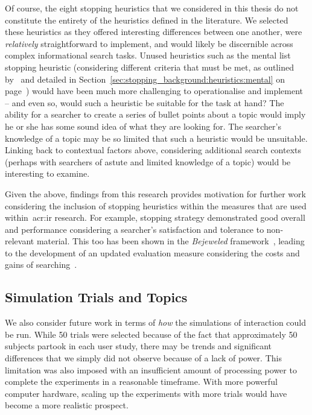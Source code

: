 Of course, the eight stopping heuristics that we considered in this thesis do not constitute the entirety of the heuristics defined in the literature. We selected these heuristics as they offered interesting differences between one another, were \emph{relatively} straightforward to implement, and would likely be discernible across complex informational search tasks. Unused heuristics such as the mental list stopping heuristic (considering different criteria that must be met, as outlined by~\cite{nickles1995judgment} and detailed in Section~\ref{sec:stopping_background:heuristics:mental} on page~\pageref{sec:stopping_background:heuristics:mental}) would have been much more challenging to operationalise and implement -- and even so, would such a heuristic be suitable for the task at hand? The ability for a searcher to create a series of bullet points about a topic would imply he or she has some sound idea of what they are looking for. The searcher's knowledge of a topic may be so limited that such a heuristic would be unsuitable. Linking back to contextual factors above, considering additional search contexts (perhaps with searchers of astute and limited knowledge of a topic) would be interesting to examine.

Given the above, findings from this research provides motivation for further work considering the inclusion of stopping heuristics within the measures that are used within~\gls{acr:ir} research. For example, stopping strategy  demonstrated good overall and performance considering a searcher's satisfaction and tolerance to non-relevant material. This too has been shown in the \emph{Bejeweled} framework~\citep{zhang2017bejewled}, leading to the development of an updated evaluation measure considering the costs and gains of searching~\citep{azzopardi2018cwl}.

\subsection{Simulation Trials and Topics}
We also consider future work in terms of \emph{how} the simulations of interaction could be run. While 50 trials were selected because of the fact that approximately 50 subjects partook in each user study, there may be trends and significant differences that we simply did not observe because of a lack of power. This limitation was also imposed with an insufficient amount of processing power to complete the experiments in a reasonable timeframe. With more powerful computer hardware, scaling up the experiments with more trials would have become a more realistic prospect.

